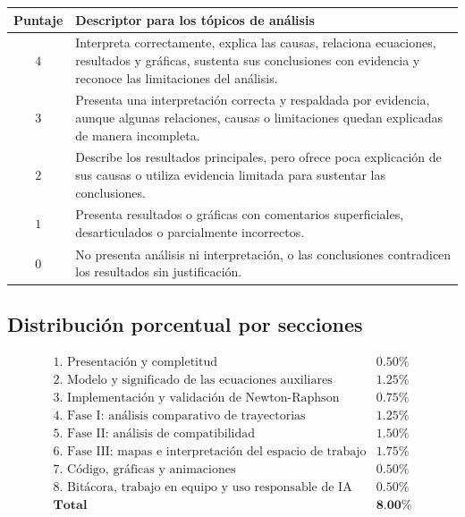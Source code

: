 \documentclass[12pt]{article}
\begin{document}
\begin{center}
\begin{tabular}{|c|p{12cm}|}
\hline
\textbf{Puntaje} & \textbf{Descriptor para los tópicos de análisis} \\
\hline
\(4\) & Interpreta correctamente, explica las causas, relaciona ecuaciones, resultados y gráficas, sustenta sus conclusiones con evidencia y reconoce las limitaciones del análisis. \\
\hline
\(3\) & Presenta una interpretación correcta y respaldada por evidencia, aunque algunas relaciones, causas o limitaciones quedan explicadas de manera incompleta. \\
\hline
\(2\) & Describe los resultados principales, pero ofrece poca explicación de sus causas o utiliza evidencia limitada para sustentar las conclusiones. \\
\hline
\(1\) & Presenta resultados o gráficas con comentarios superficiales, desarticulados o parcialmente incorrectos. \\
\hline
\(0\) & No presenta análisis ni interpretación, o las conclusiones contradicen los resultados sin justificación. \\
\hline
\end{tabular}
\end{center}

\subsection*{Distribución porcentual por secciones}

\[
\begin{array}{ll}
\text{1. Presentación y completitud} & 0.50\%\\
\text{2. Modelo y significado de las ecuaciones auxiliares} & 1.25\%\\
\text{3. Implementación y validación de Newton-Raphson} & 0.75\%\\
\text{4. Fase I: análisis comparativo de trayectorias} & 1.25\%\\
\text{5. Fase II: análisis de compatibilidad} & 1.50\%\\
\text{6. Fase III: mapas e interpretación del espacio de trabajo} & 1.75\%\\
\text{7. Código, gráficas y animaciones} & 0.50\%\\
\text{8. Bitácora, trabajo en equipo y uso responsable de IA} & 0.50\%\\
\hline
\textbf{Total} & \textbf{8.00\%}
\end{array}
\]
\end{document}
